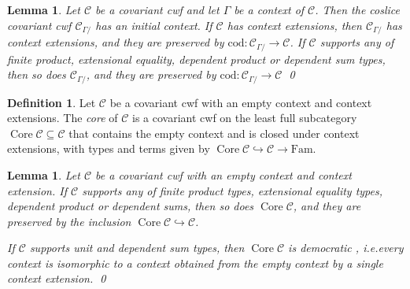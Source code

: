 \documentclass[a4paper]{article}
\newtheorem{lemma}[theorem]{Lemma}
\theoremstyle{remark}
\theoremstyle{definition}
\newtheorem{definition}[theorem]{Definition}
\begin{document}
\begin{lemma}
  \label{lem:coslice-cwf}
  Let $\mathcal{C}$ be a covariant cwf and let $\Gamma$ be a context of $\mathcal{C}$.
  Then the coslice covariant cwf $\mathcal{C}_{\Gamma /}$ has an initial context.
  If $\mathcal{C}$ has context extensions, then $\mathcal{C}_{\Gamma /}$ has context extensions, and they are preserved by $\mathrm{cod} : \mathcal{C}_{\Gamma /} \rightarrow \mathcal{C}$.
  If $\mathcal{C}$ supports any of finite product, extensional equality, dependent product or dependent sum types, then so does $\mathcal{C}_{\Gamma /}$, and they are preserved by $\mathrm{cod} : \mathcal{C}_{\Gamma /} \rightarrow \mathcal{C}$
  \qed
\end{lemma}

\begin{definition}
  Let $\mathcal{C}$ be a covariant cwf with an empty context and context extensions.
  The \emph{core} of $\mathcal{C}$ is a covariant cwf on the least full subcategory $\operatorname{Core} \mathcal{C} \subseteq \mathcal{C}$ that contains the empty context and is closed under context extensions, with types and terms given by $\operatorname{Core} \mathcal{C} \hookrightarrow \mathcal{C} \rightarrow \mathrm{Fam}$.
\end{definition}

\begin{lemma}
  \label{lem:core-cwf}
  Let $\mathcal{C}$ be a covariant cwf with an empty context and context extension.
  If $\mathcal{C}$ supports any of finite product types, extensional equality types, dependent product or dependent sums, then so does $\operatorname{Core} \mathcal{C}$, and they are preserved by the inclusion $\operatorname{Core} \mathcal{C} \hookrightarrow \mathcal{C}$.

  If $\mathcal{C}$ supports unit and dependent sum types, then $\operatorname{Core} \mathcal{C}$ is democratic \citep{biequivalence-lcc-cwf}, i.e.\@ every context is isomorphic to a context obtained from the empty context by a single context extension.
  \qed
\end{lemma}
\end{document}
